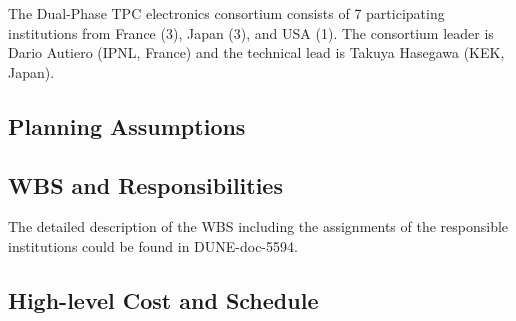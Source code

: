 The Dual-Phase TPC electronics consortium consists of \num{7} participating institutions from France (\num{3}), Japan (\num{3}), and USA (\num{1}). The consortium leader is Dario Autiero (IPNL, France) and the technical lead is Takuya Hasegawa (KEK, Japan).

\subsection{Planning Assumptions}
\label{sec:fddp-tpc-elec-org-assmp}


\subsection{WBS and Responsibilities}
\label{sec:fddp-tpc-elec-org-wbs}

The detailed description of the WBS including the assignments of the responsible institutions could be found in DUNE-doc-5594.

\subsection{High-level Cost and Schedule}
\label{sec:fddp-tpc-elec-org-cs}














